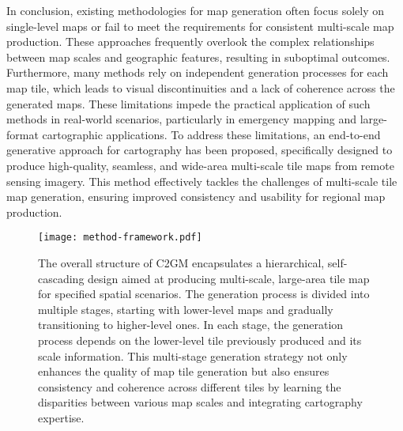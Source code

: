In conclusion, existing methodologies for map generation often focus solely on single-level maps or fail to meet the requirements for consistent multi-scale map production. These approaches frequently overlook the complex relationships between map scales and geographic features, resulting in suboptimal outcomes. Furthermore, many methods rely on independent generation processes for each map tile, which leads to visual discontinuities and a lack of coherence across the generated maps. These limitations impede the practical application of such methods in real-world scenarios, particularly in emergency mapping and large-format cartographic applications. To address these limitations, an end-to-end generative approach for cartography has been proposed, specifically designed to produce high-quality, seamless, and wide-area multi-scale tile maps from remote sensing imagery. This method effectively tackles the challenges of multi-scale tile map generation, ensuring improved consistency and usability for regional map production.

\begin{figure*}[htp]
	\centering
	\texttt{[image: method-framework.pdf]}
	\caption{
		The overall structure of C2GM encapsulates a hierarchical, self-cascading design aimed at producing multi-scale, large-area tile map for specified spatial scenarios. The generation process is divided into multiple stages, starting with lower-level maps and gradually transitioning to higher-level ones. In each stage, the generation process depends on the lower-level tile previously produced and its scale information. This multi-stage generation strategy not only enhances the quality of map tile generation but also ensures consistency and coherence across different tiles by learning the disparities between various map scales and integrating cartography expertise.
	}
	\label{fig:method-framework}
\end{figure*}
